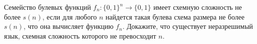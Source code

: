 Семейство булевых функций $f_n: \{0, 1\}^n \rightarrow \{0, 1\}$ имеет схемную сложность не более $s(n)$,
если для любого $n$ найдется такая булева схема размера не более $s(n)$, что она вычисляет функцию
$f_n$. Докажите, что существует неразрешимый язык, схемная сложность которого не превосходит $n$.